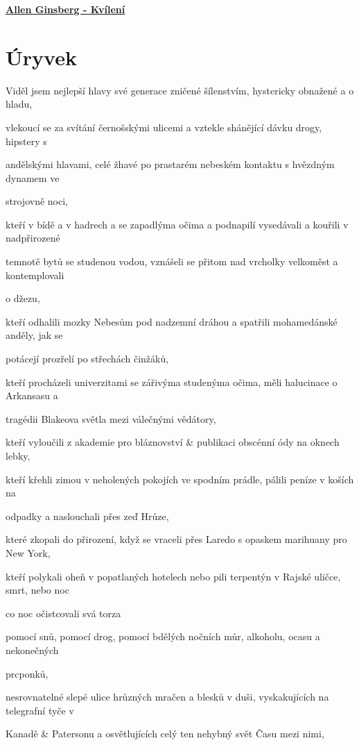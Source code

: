 \documentclass[11pt]{article}
\begin{document}
    \begin{center}
        \underline{\textbf{\Huge Allen Ginsberg - Kvílení}}
    \end{center}
    \section*{Úryvek}
    \begin{center}
Viděl jsem nejlepší hlavy své generace zničené šílenstvím, hystericky obnažené a o hladu,

vlekoucí se za svítání černošskými ulicemi a vztekle shánějící dávku drogy, hipstery s

andělskými hlavami, celé žhavé po prastarém nebeském kontaktu s hvězdným dynamem ve

strojovně noci,

kteří v bídě a v hadrech a se zapadlýma očima a podnapilí vysedávali a kouřili v nadpřirozené

temnotě bytů se studenou vodou, vznášeli se přitom nad vrcholky velkoměst a kontemplovali

o džezu,

kteří odhalili mozky Nebesům pod nadzemní dráhou a spatřili mohamedánské anděly, jak se

potácejí prozřelí po střechách činžáků,

kteří procházeli univerzitami se zářivýma studenýma očima, měli halucinace o Arkansasu a

tragédii Blakeova světla mezi válečnými vědátory,

kteří vyloučili z akademie pro bláznovství \& publikaci obscénní ódy na oknech lebky,

kteří křehli zimou v neholených pokojích ve spodním prádle, pálili peníze v koších na

odpadky a naslouchali přes zeď Hrůze,

které zkopali do přirození, když se vraceli přes Laredo s opaskem marihuany pro New York,

kteří polykali oheň v popatlaných hotelech nebo pili terpentýn v Rajské uličce, smrt, nebo noc

co noc očistcovali svá torza

pomocí snů, pomocí drog, pomocí bdělých nočních můr, alkoholu, ocasu a nekonečných

prcponků,

nesrovnatelné slepé ulice hrůzných mračen a blesků v duši, vyskakujících na telegrafní tyče v

Kanadě \& Patersonu a osvětlujících celý ten nehybný svět Času mezi nimi,


\end{center}
\end{document}
